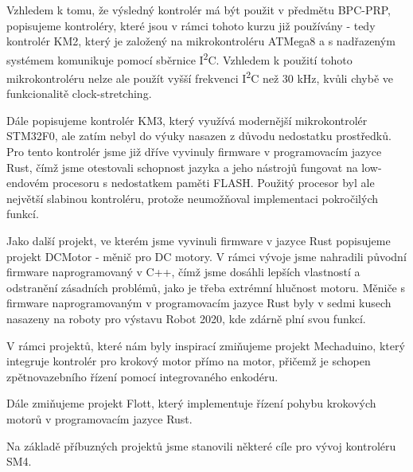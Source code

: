 Vzhledem k tomu, že výsledný kontrolér má být použit v předmětu BPC-PRP, popisujeme kontroléry, které jsou v rámci tohoto kurzu již používány - tedy kontrolér KM2, který je založený na mikrokontroléru ATMega8 a s nadřazeným systémem komunikuje pomocí sběrnice I\textsuperscript{2}C.
Vzhledem k použití tohoto mikrokontroléru nelze ale použít vyšší frekvenci I\textsuperscript{2}C než 30 kHz, kvůli chybě ve funkcionalitě clock-stretching.

Dále popisujeme kontrolér KM3, který využívá modernější mikrokontrolér STM32F0, ale zatím nebyl do výuky nasazen z důvodu nedostatku prostředků.
Pro tento kontrolér jsme již dříve vyvinuly firmware v programovacím jazyce Rust, čímž jsme otestovali schopnost jazyka a jeho nástrojů fungovat na low-endovém procesoru s nedostatkem paměti FLASH.
Použitý procesor byl ale největší slabinou kontroléru, protože neumožňoval implementaci pokročilých funkcí.

Jako další projekt, ve kterém jsme vyvinuli firmware v jazyce Rust popisujeme projekt DCMotor - měnič pro DC motory.
V rámci vývoje jsme nahradili původní firmware naprogramovaný v C++, čímž jsme dosáhli lepších vlastností a odstranění zásadních problémů, jako je třeba extrémní hlučnost motoru.
Měniče s firmware naprogramovaným v programovacím jazyce Rust byly v sedmi kusech nasazeny na roboty pro výstavu Robot 2020, kde zdárně plní svou funkcí.

V rámci projektů, které nám byly inspirací zmiňujeme projekt Mechaduino, který integruje kontrolér pro krokový motor přímo na motor, přičemž je schopen zpětnovazebního řízení pomocí integrovaného enkodéru.

Dále zmiňujeme projekt Flott, který implementuje řízení pohybu krokových motorů v programovacím jazyce Rust.

Na základě příbuzných projektů jsme stanovili některé cíle pro vývoj kontroléru SM4.

